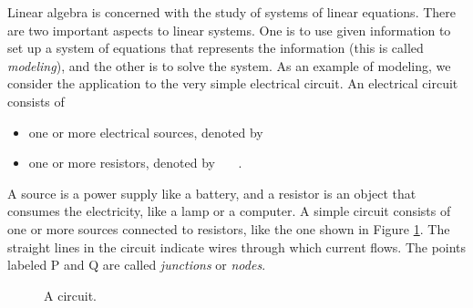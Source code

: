 \label{chap:intro_linear_systems}


\vspace*{-17 pt}

\vspace*{13 pt}

\label{sec:appl_elec_circuits}

Linear algebra is concerned with the study of systems of linear equations. There are two important aspects to linear systems. One is to use given information to set up a system of equations that represents the information (this is called \emph{modeling}), and the other is to solve the system.  As an example of modeling, we consider the application to the very simple electrical circuit. An electrical circuit consists of
\begin{itemize}
\item one or more electrical sources, denoted by \ \ \  
\item one or more resistors, denoted by \ \ \ 
.
\end{itemize}
A source is a power supply like a battery, and a resistor is an object that consumes the electricity, like a lamp or a computer. A simple circuit consists of one or more sources connected to resistors, like the one shown in Figure \ref{F:circuit1}. The straight lines in the circuit indicate wires through which current flows. The points labeled P and Q are called \emph{junctions} or \emph{nodes}.
\begin{figure}[h]
\begin{center}
\end{center}
\caption{A circuit.}
\label{F:circuit1}
\end{figure}

